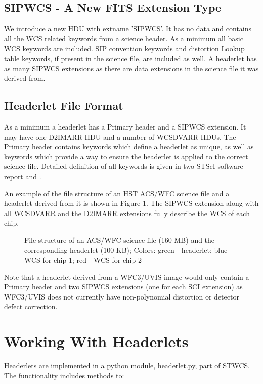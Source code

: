 \subsection{SIPWCS - A New FITS Extension Type}
We introduce a new HDU with extname 'SIPWCS'. It has no data and contains 
all the WCS related keywords from a science header.
As a minimum all basic WCS keywords \citep{greisen_2002} are included. SIP
convention keywords \citep{shupe_2005} and distortion Lookup table keywords, 
if present in the science file, are included as well. A headerlet has as
many SIPWCS extensions as there are data extensions in the science
file it was derived from. 

\subsection{Headerlet File Format}
As a minimum a headerlet has a Primary header
 and a SIPWCS extension. It may have one D2IMARR HDU and a number of
WCSDVARR HDUs. The Primary header contains keywords which define a headerlet as
unique, as well as keywords which provide a way to ensure the headerlet is 
applied to the correct science file. Detailed definition of all keywords is given in two STScI software report \citep{hack_fc} and \citep{hack_hlet}.

An example of the file structure of an HST ACS/WFC science
file and a headerlet derived from it is shown in Figure 1.
The SIPWCS extension along with all WCSDVARR and the D2IMARR extensions fully describe the WCS of each chip.

\begin{figure}[!h]
\caption{File structure of an ACS/WFC science file (160 MB) and the corresponding headerlet (100 KB); Colors: green - headerlet; blue - WCS for chip 1; red - WCS for chip 2}
\end{figure}

Note that a headerlet derived from a WFC3/UVIS image would only contain a 
Primary header and two SIPWCS extensions (one for each SCI extension) as
WFC3/UVIS does not currently have non-polynomial distortion or detector
defect correction.

\section{Working With Headerlets}
Headerlets are implemented in a python module, headerlet.py, part of STWCS. The functionality includes methods to:

